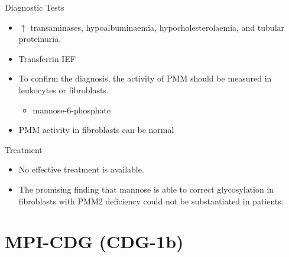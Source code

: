\documentclass[presentation, smaller]{beamer}
\begin{document}
\begin{frame}[label={sec:org887d5fd}]{Diagnostic Tests}
\begin{itemize}
\item \(\uparrow\) transaminases, hypoalbuminaemia, hypocholesterolaemia, and
tubular proteinuria.
\item Transferrin IEF
\item To confirm the diagnosis, the activity of PMM should be measured in
leukocytes or fibroblasts.
\begin{itemize}
\item\relax [2-H\(^{\text{3}}\)]mannose-6-phosphate
\end{itemize}
\item PMM activity in fibroblasts can be normal
\end{itemize}
\end{frame}

\begin{frame}[label={sec:org50c23de}]{Treatment}
\begin{itemize}
\item No effective treatment is available.
\item The promising finding that mannose is able to correct glycosylation
in fibroblasts with PMM2 deficiency could not be substantiated in patients.
\end{itemize}
\end{frame}

\section{MPI-CDG (CDG-1b)}
\label{sec:orgbd3243f}
\end{document}
